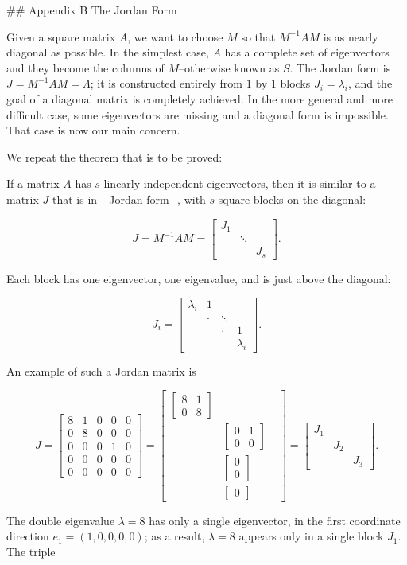 

## Appendix B The Jordan Form

Given a square matrix \(A\), we want to choose \(M\) so that \(M^{-1}AM\) is as nearly diagonal as possible. In the simplest case, \(A\) has a complete set of eigenvectors and they become the columns of \(M\)--otherwise known as \(S\). The Jordan form is \(J=M^{-1}AM=\Lambda\); it is constructed entirely from \(1\) by \(1\) blocks \(J_{i}=\lambda_{i}\), and the goal of a diagonal matrix is completely achieved. In the more general and more difficult case, some eigenvectors are missing and a diagonal form is impossible. That case is now our main concern.

We repeat the theorem that is to be proved:

If a matrix \(A\) has \(s\) linearly independent eigenvectors, then it is similar to a matrix \(J\) that is in _Jordan form_, with \(s\) square blocks on the diagonal:

\[J=M^{-1}AM=\begin{bmatrix}J_{1}&&\\ &\ddots&\\ &&J_{s}\end{bmatrix}.\]

Each block has one eigenvector, one eigenvalue, and is just above the diagonal:

\[J_{i}=\begin{bmatrix}\lambda_{i}&1&&\\ &\cdot&\ddots&\\ &&\cdot&1\\ &&&\lambda_{i}\end{bmatrix}.\]

An example of such a Jordan matrix is

\[J=\begin{bmatrix}8&1&0&0&0\\ 0&8&0&0&0\\ 0&0&0&1&0\\ 0&0&0&0&0\\ 0&0&0&0&0\end{bmatrix}=\begin{bmatrix}\begin{bmatrix}8&1\\ 0&8\end{bmatrix}&&\\ &\begin{bmatrix}0&1\\ 0&0\end{bmatrix}&\\ &\begin{bmatrix}0\\ 0\end{bmatrix}&\\ &\begin{bmatrix}0\end{bmatrix}\end{bmatrix}=\begin{bmatrix}J_{1}&&\\ &J_{2}&\\ &&J_{3}\end{bmatrix}.\]

The double eigenvalue \(\lambda=8\) has only a single eigenvector, in the first coordinate direction \(e_{1}=(1,0,0,0,0)\); as a result, \(\lambda=8\) appears only in a single block \(J_{1}\). The triple